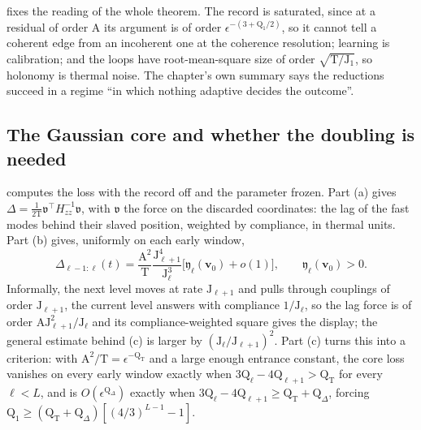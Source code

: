  fixes the reading of the whole theorem. The record is saturated, since at a
residual of order \(\mathrm A\) its argument is of order \(\epsilon^{-(3+\mathrm Q_1/2)}\), so it cannot tell a
coherent edge from an incoherent one at the coherence resolution; learning is calibration; and the loops
have root-mean-square size of order \(\sqrt{\mathrm T/\mathrm J_1}\), so holonomy is thermal noise. The
chapter's own summary says the reductions succeed in a regime ``in which nothing adaptive decides the
outcome''.

\subsection{The Gaussian core and whether the doubling is needed}
\label{comp:ch13-core}

 computes the loss with the record off and the parameter frozen. Part (a)
gives \(\Delta=\tfrac1{2\mathrm T}\mathfrak v^\top H_{zz}^{-1}\mathfrak v\), with \(\mathfrak v\) the force on the
discarded coordinates: the lag of the fast modes behind their slaved position, weighted by compliance, in
thermal units. Part (b) gives, uniformly on each early window,
\[
\Delta_{\ell-1:\ell}(t)=\frac{\mathrm A^2}{\mathrm T}\frac{\mathrm J_{\ell+1}^4}{\mathrm J_\ell^3}
\bigl[\mathfrak y_\ell(\mathbf v_0)+o(1)\bigr],
\qquad \mathfrak y_\ell(\mathbf v_0)>0 .
\]
Informally, the next level moves at rate \(\mathrm J_{\ell+1}\) and pulls through couplings of order
\(\mathrm J_{\ell+1}\), the current level answers with compliance \(1/\mathrm J_\ell\), so the lag force is of
order \(\mathrm A\mathrm J_{\ell+1}^2/\mathrm J_\ell\) and its compliance-weighted square gives the display;
the general estimate behind (c) is larger by \((\mathrm J_\ell/\mathrm J_{\ell+1})^2\). Part (c) turns this into
a criterion: with \(\mathrm A^2/\mathrm T=\epsilon^{-\mathrm Q_{\mathrm T}}\) and a large enough entrance constant,
the core loss vanishes on every early window exactly when \(3\mathrm Q_\ell-4\mathrm Q_{\ell+1}>\mathrm Q_{\mathrm T}\) for every \(\ell<L\), and is
\(O(\epsilon^{\mathrm Q_\Delta})\) exactly when
\(3\mathrm Q_\ell-4\mathrm Q_{\ell+1}\ge\mathrm Q_{\mathrm T}+\mathrm Q_\Delta\), forcing
\(\mathrm Q_1\ge(\mathrm Q_{\mathrm T}+\mathrm Q_\Delta)[(4/3)^{L-1}-1]\).

